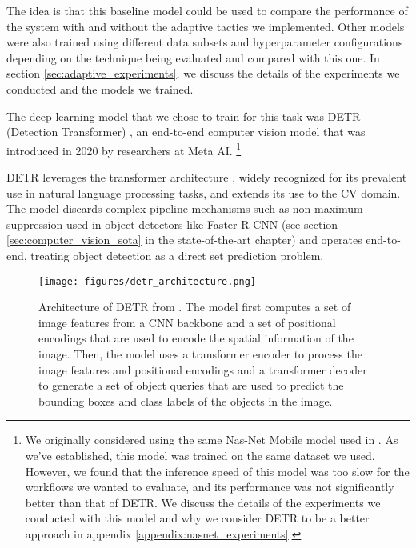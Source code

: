 \documentclass[../main.tex]{subfiles}
\begin{document}
 The idea is that this baseline model could be used to compare the performance of the system with and without the adaptive tactics we implemented. Other models were also trained using different data subsets and hyperparameter configurations depending on the technique being evaluated and compared with this one. In section \ref{sec:adaptive_experiments}, we discuss the details of the experiments we conducted and the models we trained.

 The deep learning model that we chose to train for this task was DETR (Detection Transformer) \cite{carionEndtoEndObjectDetection2020}, an end-to-end computer vision model that was introduced in 2020 by researchers at Meta AI. \footnote{We originally considered using the same Nas-Net Mobile model used in \cite{visuna_novel_2023}. As we've established, this model was trained on the same dataset we used. However, we found that the inference speed of this model was too slow for the workflows we wanted to evaluate, and its performance was not significantly better than that of DETR. We discuss the details of the experiments we conducted with this model and why we consider DETR to be a better approach in appendix \ref{appendix:nasnet_experiments}.}

 DETR leverages the transformer architecture \cite{vaswaniAttentionAllYou2017}, widely recognized for its prevalent use in natural language processing tasks, and extends its use to the CV domain. The model discards complex pipeline mechanisms such as non-maximum suppression used in object detectors like Faster R-CNN (see section \ref{sec:computer_vision_sota} in the state-of-the-art chapter) and operates end-to-end, treating object detection as a direct set prediction problem.

 \begin{figure}[t]
     \centering
     \texttt{[image: figures/detr\_architecture.png]}
     \caption{
        Architecture of DETR from \cite{carionEndtoEndObjectDetection2020}. 
        \footnotesize The model first computes a set of image features from a CNN backbone and a set of positional encodings that are used to encode the spatial information of the image. Then, the model uses a transformer encoder to process the image features and positional encodings and a transformer decoder to generate a set of object queries that are used to predict the bounding boxes and class labels of the objects in the image.
     }
     \label{fig:detr-architecture}
 \end{figure}
\end{document}
